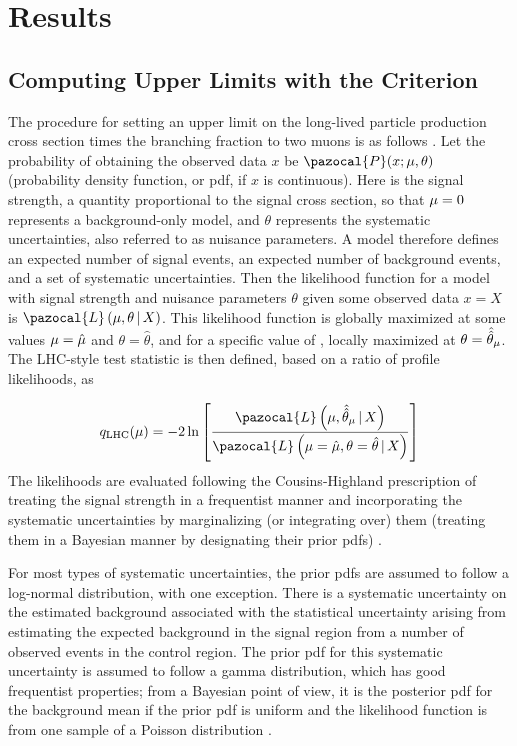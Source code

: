 \section{Results}
\subsection{Computing Upper Limits with the \CLs Criterion}
\label{sec:dd:cls}
The procedure for setting an upper limit on the long-lived particle production cross section times the branching fraction to two muons is as follows \cite{CMS-NOTE-2011-005}.
Let the probability of obtaining the observed data $x$ be $\pazocal{P}(x; \sigstr, \theta)$ (probability density function, or pdf, if $x$ is continuous).
Here \sigstr is the signal strength, a quantity proportional to the signal cross section, so that $\mu = 0$ represents a background-only model, and $\theta$ represents the systematic uncertainties, also referred to as nuisance parameters.
A model therefore defines an expected number of signal events, an expected number of background events, and a set of systematic uncertainties.
Then the likelihood function for a model with signal strength \sigstr and nuisance parameters $\theta$ given some observed data $x = X$ is $\pazocal{L}\left(\sigstr, \theta \,\vert\, X\right)$.
This likelihood function is globally maximized at some values $\mu = \hat{\mu}$ and $\theta = \hat{\theta}$, and for a specific value of \sigstr, locally maximized at $\theta = \hat{\hat{\theta}}_\mu$.
The LHC-style test statistic \cite{CombineManual} is then defined, based on a ratio of profile likelihoods, as

\begin{equation}
  q_\text{LHC}(\sigstr) = -2\ln\left[\frac{\pazocal{L}\left(\sigstr, \hat{\hat{\theta}}_\sigstr \,\vert\, X\right)}{\pazocal{L}\left(\sigstr = \hat{\sigstr}, \theta=\hat{\theta}\,\vert\,  X\right)}\right]
  \label{eq:dd:qLHC}
\end{equation}
The likelihoods are evaluated following the Cousins-Highland prescription of treating the signal strength in a frequentist manner and incorporating the systematic uncertainties by marginalizing (or integrating over) them (treating them in a Bayesian manner by designating their prior pdfs) \cite{CousinsHighland:SystUnc1992}.

For most types of systematic uncertainties, the prior pdfs are assumed to follow a log-normal distribution, with one exception.
There is a systematic uncertainty on the estimated background associated with the statistical uncertainty arising from estimating the expected background in the signal region from a number of observed events in the control region.
The prior pdf for this systematic uncertainty is assumed to follow a gamma distribution, which has good frequentist properties; from a Bayesian point of view, it is the posterior pdf for the background mean if the prior pdf is uniform and the likelihood function is from one sample of a Poisson distribution \cite{Cousins:ZBi2008, Cousins:LogNormal}.

